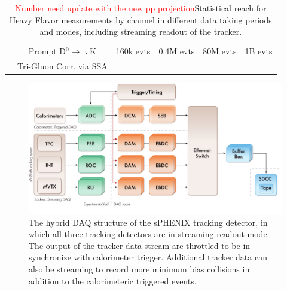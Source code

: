 \begin{table}
\begin{tabular}{|c|c|c|c|c|c|}
        &
        Prompt D$^{0} \rightarrow$ $\pi$K  
        & 160k evts  
        & 0.4M evts
        & 80M evts 
        & 1B evts \\ 
         & Tri-Gluon Corr. via SSA 
        &   
        &  
        & 
        &  \\ \hline 
        
    \end{tabular}
    \caption{{\textcolor{red}{Number need update with the new pp projection}}Statistical reach for Heavy Flavor \pp measurements by channel in different data taking periods and modes, including streaming readout of the tracker.}
    \label{tab:HFppreach}
\end{table}
 




\begin{figure}[htbp]
\begin{center}
\includegraphics[width=.8\linewidth]{figs/DAQ structure_rev3.pdf}
\caption{The hybrid DAQ structure of the sPHENIX tracking detector, in which  all three tracking detectors are in streaming readout mode. The output of the tracker data stream are throttled to be in synchronize with calorimeter trigger. Additional tracker data can also be streaming to record more minimum bias collisions in addition to the calorimeteric triggered events.}
\label{fig:TPC-DAQ-structure}
\end{center}
\end{figure}
